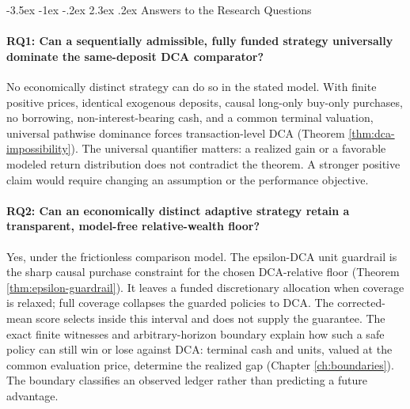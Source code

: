 \documentclass[12pt,a4paper,oneside]{report}
\makeatletter
\renewcommand\section{\@startsection{section}{1}{\z@}%
  {-3.5ex \@plus -1ex \@minus -.2ex}%
  {2.3ex \@plus .2ex}%
  {\normalfont\fontsize{14}{17}\selectfont\bfseries}}
\makeatother
\begin{document}
\section{Answers to the Research Questions}
\label{sec:conclusion-answers}

\paragraph{RQ1: Can a sequentially admissible, fully funded strategy
universally dominate the same-deposit DCA comparator?}
No economically distinct strategy can do so in the stated model. With finite
positive prices, identical exogenous deposits, causal long-only buy-only
purchases, no borrowing, non-interest-bearing cash, and a common terminal
valuation, universal pathwise dominance forces transaction-level DCA
(Theorem \ref{thm:dca-impossibility}). The universal quantifier matters: a
realized gain or a favorable modeled return distribution does not contradict
the theorem. A stronger positive claim would require changing an assumption
or the performance objective.

\paragraph{RQ2: Can an economically distinct adaptive strategy retain a
transparent, model-free relative-wealth floor?}
Yes, under the frictionless comparison model. The epsilon-DCA unit guardrail
is the sharp causal purchase constraint for the chosen DCA-relative floor
(Theorem \ref{thm:epsilon-guardrail}). It leaves a funded discretionary
allocation when coverage is relaxed; full coverage collapses the guarded
policies to DCA. The corrected-mean score selects inside this interval and
does not supply the guarantee. The exact finite witnesses and arbitrary-horizon
boundary explain how such a safe policy can still win or lose against DCA:
terminal cash and units, valued at the common evaluation price, determine the
realized gap (Chapter \ref{ch:boundaries}). The boundary classifies an observed
ledger rather than predicting a future advantage.
\end{document}
